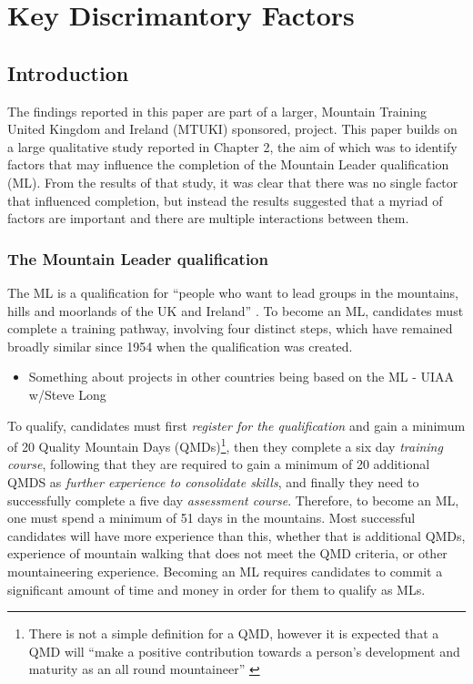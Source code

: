 \documentclass[a4paper,]{book}
\providecommand{\tightlist}{%
  \setlength{\itemsep}{0pt}\setlength{\parskip}{0pt}}
\begin{document}
\hypertarget{key-discrimantory-factors}{%
\chapter{Key Discrimantory Factors}\label{key-discrimantory-factors}}

\hypertarget{introduction-1}{%
\section{Introduction}\label{introduction-1}}

The findings reported in this paper are part of a larger, Mountain Training United Kingdom and Ireland (MTUKI) sponsored, project. This paper builds on a large qualitative study reported in Chapter 2, the aim of which was to identify factors that may influence the completion of the Mountain Leader qualification (ML). From the results of that study, it was clear that there was no single factor that influenced completion, but instead the results suggested that a myriad of factors are important and there are multiple interactions between them.

\hypertarget{the-mountain-leader-qualification}{%
\subsection{The Mountain Leader qualification}\label{the-mountain-leader-qualification}}

The ML is a qualification for ``people who want to lead groups in the mountains, hills and moorlands of the UK and Ireland'' \citep{MountainTrainingUK2015a}. To become an ML, candidates must complete a training pathway, involving four distinct steps, which have remained broadly similar since 1954 when the qualification was created.

\begin{itemize}
\tightlist
\item
  Something about projects in other countries being based on the ML - UIAA w/Steve Long
\end{itemize}

To qualify, candidates must first \emph{register for the qualification} and gain a minimum of 20 Quality Mountain Days (QMDs)\footnote{There is not a simple definition for a QMD, however it is expected that a QMD will ``make a positive contribution towards a person's development and maturity as an all round mountaineer'' \citep{MountainTraining2019}}, then they complete a six day \emph{training course}, following that they are required to gain a minimum of 20 additional QMDS as \emph{further experience to consolidate skills}, and finally they need to successfully complete a five day \emph{assessment course}. Therefore, to become an ML, one must spend a minimum of 51 days in the mountains. Most successful candidates will have more experience than this, whether that is additional QMDs, experience of mountain walking that does not meet the QMD criteria, or other mountaineering experience. Becoming an ML requires candidates to commit a significant amount of time and money in order for them to qualify as MLs.
\end{document}
